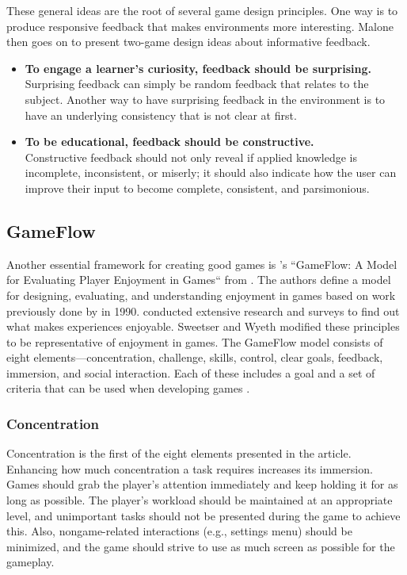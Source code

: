 \documentclass[../Main.tex]{subfiles}
\begin{document}
These general ideas are the root of several game design principles. One way is to produce responsive feedback that makes environments more interesting. Malone then goes on to present two-game design ideas about informative feedback.

\begin{itemize}
    \item \textbf{To engage a learner’s curiosity, feedback should be surprising.}\\
    Surprising feedback can simply be random feedback that relates to the subject. Another way to have surprising feedback in the environment is to have an underlying consistency that is not clear at first.
    \item \textbf{To be educational, feedback should be constructive.} \\
    Constructive feedback should not only reveal if applied knowledge is incomplete, inconsistent, or miserly; it should also indicate how the user can improve their input to become complete, consistent, and parsimonious.
\end{itemize}

\subsection{GameFlow}
Another essential framework for creating good games is \citeauthor{sweetser_gameflow_2005}’s “GameFlow: A Model for Evaluating Player Enjoyment in Games“ from \citeyear{sweetser_gameflow_2005}. The authors define a model for designing, evaluating, and understanding enjoyment in games based on work previously done by \citeauthor{csikszentmihalyi_flow_1990} in 1990. \citeauthor{csikszentmihalyi_flow_1990} conducted extensive research and surveys to find out what makes experiences enjoyable. Sweetser and Wyeth modified these principles to be representative of enjoyment in games. The GameFlow model consists of eight elements—concentration, challenge, skills, control, clear goals, feedback, immersion, and social interaction. Each of these includes a goal and a set of criteria that can be used when developing games \citep{sweetser_gameflow_2005}.

\subsubsection{Concentration}
Concentration is the first of the eight elements presented in the article. Enhancing how much concentration a task requires increases its immersion. Games should grab the player’s attention immediately and keep holding it for as long as possible. The player’s workload should be maintained at an appropriate level, and unimportant tasks should not be presented during the game to achieve this. Also, nongame-related interactions (e.g., settings menu) should be minimized, and the game should strive to use as much screen as possible for the gameplay. 
\end{document}
